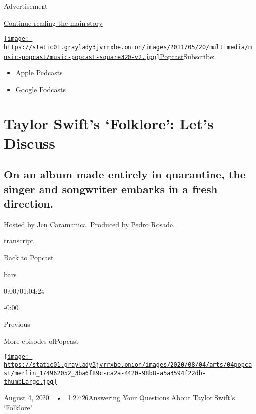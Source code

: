 Advertisement

\protect\hyperlink{after-top}{Continue reading the main story}

\href{https://www.nytimes3xbfgragh.onion/column/popcast-pop-music-podcast}{\texttt{[image: https://static01.graylady3jvrrxbe.onion/images/2011/05/20/multimedia/music-popcast/music-popcast-square320-v2.jpg]}Popcast}Subscribe:

\begin{itemize}
\tightlist
\item
  \href{https://itunes.apple.com/us/podcast/id120315823}{Apple Podcasts}
\item
  \href{https://play.google.com/music/listen?u=0\#/ps/Izaidkcp4ffluag7z7wuzica2su}{Google
  Podcasts}
\end{itemize}

\hypertarget{taylor-swifts-folklore-lets-discuss}{%
\section{Taylor Swift's `Folklore': Let's
Discuss}\label{taylor-swifts-folklore-lets-discuss}}

\hypertarget{on-an-album-made-entirely-in-quarantine-the-singer-and-songwriter-embarks-in-a-fresh-direction}{%
\subsection{On an album made entirely in quarantine, the singer and
songwriter embarks in a fresh
direction.}\label{on-an-album-made-entirely-in-quarantine-the-singer-and-songwriter-embarks-in-a-fresh-direction}}

Hosted by Jon Caramanica. Produced by Pedro Rosado.

transcript

Back to Popcast

bars

0:00/01:04:24

-0:00

Previous

More episodes ofPopcast

\href{https://www.nytimes3xbfgragh.onion/2020/08/04/arts/music/taylor-swift-folklore-questions.html?action=click\&module=audio-series-bar\&region=header\&pgtype=Article}{\texttt{[image: https://static01.graylady3jvrrxbe.onion/images/2020/08/04/arts/04popcast/merlin\_174962052\_3ba6f89c-ca2a-4420-98b8-a5a3594f22db-thumbLarge.jpg]}}

August 4, 2020~~•~ 1:27:26Answering Your Questions About Taylor Swift's
`Folklore'


